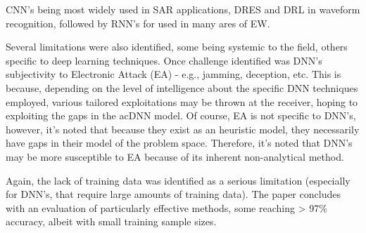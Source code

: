 CNN's being most widely used in \ac{SAR} applications, DRES and DRL in waveform recognition, followed by RNN's for used in many ares of \ac{EW}.

Several limitations were also identified, some being systemic to the field, others specific to deep learning techniques.
Once challenge identified was \ac{DNN}'s subjectivity to Electronic Attack (EA) - e.g., jamming, deception, etc.
This is because, depending on the level of intelligence about the specific \ac{DNN} techniques employed, various tailored exploitations may be thrown at the receiver, hoping to exploiting the gaps in the ac{DNN} model.
Of course, \ac{EA} is not specific to \ac{DNN}'s, however, it's noted that because they exist as an heuristic model, they necessarily have gaps in their model of the problem space.
Therefore, it's noted that \ac{DNN}'s may be more susceptible to EA because of its inherent non-analytical method.

Again, the lack of training data was identified as a serious limitation (especially for \ac{DNN}'s, that require large amounts of training data).
The paper concludes with an evaluation of particularly effective methods, some reaching > 97\% accuracy, albeit with small training sample sizes.



